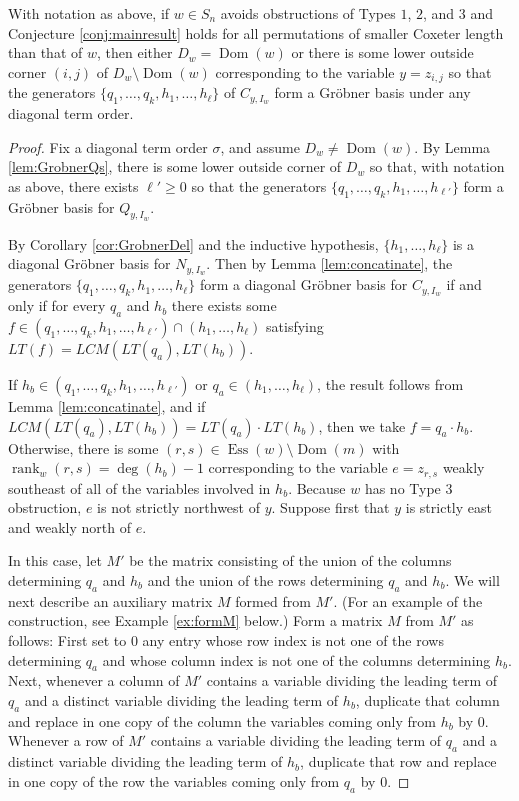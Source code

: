 \documentclass[ALCO,Unicode,published]{cedram}
\DeclareMathOperator{\Ess}{Ess}
\DeclareMathOperator{\rank}{rank}
\DeclareMathOperator{\Dom}{Dom}
\begin{document}
\begin{lemma}\label{lem:GrobnerLink}
With notation as above, if $w \in S_n$ avoids obstructions of Types $1$, $2$, and $3$ and Conjecture \ref{conj:mainresult} holds for all permutations of smaller Coxeter length than that of $w$, then either $D_w = \Dom(w)$ or there is some lower outside corner $(i,j)$ of $D_w \setminus \Dom(w)$ corresponding to the variable $y = z_{i,j}$ so that the generators $\{q_1, \ldots, q_k, h_1, \ldots, h_\ell\}$ of $C_{y,I_w}$ form a Gr\"obner basis under any diagonal term order.
\end{lemma}
\begin{proof}
Fix a diagonal term order $\sigma$, and assume $D_w \neq \Dom(w)$.  By Lemma \ref{lem:GrobnerQs}, there is some lower outside corner of $D_w$ so that, with notation as above, there exists $\ell' \geq 0$ so that the generators $\{q_1, \ldots, q_k, h_1, \ldots, h_{\ell'} \}$ form a Gr\"obner basis for $Q_{y,I_w}$.  

By Corollary \ref{cor:GrobnerDel} and the inductive hypothesis, $\{h_1,\ldots, h_\ell\}$ is a diagonal Gr\"obner basis for $N_{y,I_w}$.  Then by Lemma \ref{lem:concatinate}, the generators $\{q_1, \ldots, q_k, h_1, \ldots, h_\ell\}$ form a diagonal Gr\"obner basis for $C_{y,I_w}$ if and only if for every $q_a$ and $h_b$ there exists some $f \in (q_1, \ldots, q_k, h_1, \ldots, h_{\ell'}) \cap (h_1, \ldots, h_\ell)$ satisfying $LT(f) = LCM(LT(q_a),LT(h_b))$.  

If $h_b \in (q_1, \ldots, q_k, h_1, \ldots, h_{\ell'})$ or $q_a \in (h_1, \ldots, h_\ell)$, the result follows from Lemma \ref{lem:concatinate}, and if $LCM(LT(q_a),LT(h_b)) = LT(q_a) \cdot LT(h_b)$, then we take $f = q_a \cdot h_b$.  Otherwise, there is some $(r,s) \in \Ess(w) \setminus \Dom(m)$ with $\rank_w(r,s) = \deg(h_b)-1$ corresponding to the variable $e = z_{r,s}$ weakly southeast of all of the variables involved in $h_b$.  Because $w$ has no Type $3$ obstruction, $e$ is not strictly northwest of $y$.  Suppose first that $y$ is strictly east and weakly north of $e$.

In this case, let $M'$ be the matrix consisting of the union of the columns determining $q_a$ and $h_b$ and the union of the rows determining $q_a$ and $h_b$.  We will next describe an auxiliary matrix $M$ formed from $M'$. (For an example of the construction, see Example \ref{ex:formM} below.)  Form a matrix $M$ from $M'$ as follows: First set to $0$ any entry whose row index is not one of the rows determining $q_a$ and whose column index is not one of the columns determining $h_b$.  Next, whenever a column of $M'$ contains a variable dividing the leading term of $q_a$ and a distinct variable dividing the leading term of $h_b$, duplicate that column and replace in one copy of the column the variables coming only from $h_b$ by $0$.  Whenever a row of $M'$ contains a variable dividing the leading term of $q_a$ and a distinct variable dividing the leading term of $h_b$, duplicate that row and replace in one copy of the row the variables coming only from $q_a$ by $0$.  


\end{proof}
\end{document}
